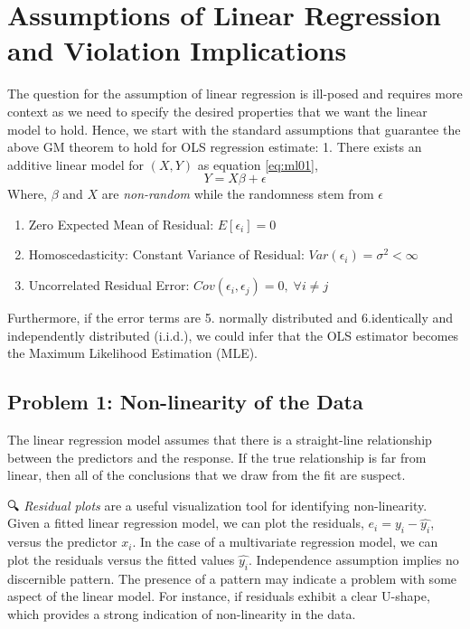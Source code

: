 \documentclass[
]{book}
\begin{document}
\hypertarget{assumptions-of-linear-regression-and-violation-implications}{%
\section{Assumptions of Linear Regression and Violation Implications}\label{assumptions-of-linear-regression-and-violation-implications}}

The question for the assumption of linear regression is ill-posed and requires more context as we need to specify the desired properties that we want the linear model to hold. Hence, we start with the standard assumptions that guarantee the above GM theorem to hold for OLS regression estimate:
1. There exists an additive linear model for \((X, Y)\) as equation \eqref{eq:ml01},
\[
Y= X \beta + \epsilon
\]
Where, \(\beta\) and \(X\) are {\emph{non-random}} while the randomness stem from \(\epsilon\)

\begin{enumerate}
\def\labelenumi{\arabic{enumi}.}
\setcounter{enumi}{1}
\item
  Zero Expected Mean of Residual: \(E[ \epsilon_i] = 0\)
\item
  Homoscedasticity: Constant Variance of Residual: \(Var(\epsilon_i)=\sigma^2 < \infty\)
\item
  Uncorrelated Residual Error: \(Cov(\epsilon_i, \epsilon_j)=0, \; \forall i\neq j\)
\end{enumerate}

Furthermore, if the error terms are 5. normally distributed and 6.identically and independently distributed (i.i.d.), we could infer that the OLS estimator becomes the Maximum Likelihood Estimation (MLE).

\hypertarget{problem-1-non-linearity-of-the-data}{%
\subsection*{Problem 1: Non-linearity of the Data}\label{problem-1-non-linearity-of-the-data}}

The linear regression model assumes that there is a straight-line relationship between the predictors and the response. If the true relationship is far from linear, then all of the conclusions that we draw from the fit are suspect.

🔍 \emph{Residual plots} are a useful visualization tool for identifying non-linearity. Given a fitted linear regression model, we can plot the residuals, \(e_i = y_i - \hat{y_i}\), versus the predictor \(x_i\). In the case of a multivariate regression model, we can plot the residuals versus the fitted values \(\hat{y_i}\). Independence assumption implies no discernible pattern. The presence of a pattern may indicate a problem with some aspect of the linear model. For instance, if residuals exhibit a clear U-shape, which provides a strong indication of non-linearity in the data.
\end{document}
